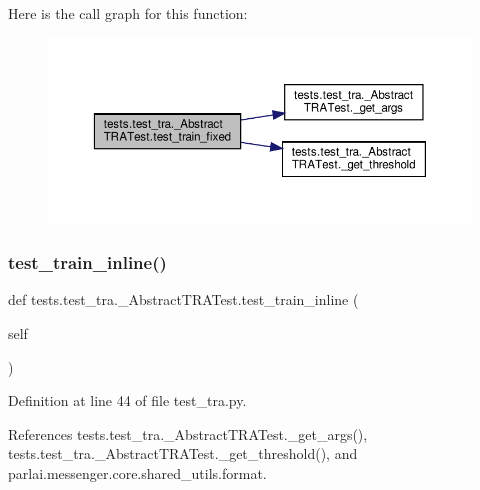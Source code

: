 Here is the call graph for this function\+:
\nopagebreak
\begin{figure}[H]
\begin{center}
\leavevmode
\includegraphics[width=350pt]{classtests_1_1test__tra_1_1__AbstractTRATest_a30a5312eaf7639e762ddbd410e31332c_cgraph}
\end{center}
\end{figure}
\mbox{\label{classtests_1_1test__tra_1_1__AbstractTRATest_a8f1fa4ff06f7fd52c1639655561fe7ee}} 
\subsubsection{\texorpdfstring{test\+\_\+train\+\_\+inline()}{test\_train\_inline()}}
{\footnotesize\ttfamily def tests.\+test\+\_\+tra.\+\_\+\+Abstract\+T\+R\+A\+Test.\+test\+\_\+train\+\_\+inline (\begin{DoxyParamCaption}\item[{}]{self }\end{DoxyParamCaption})}



Definition at line 44 of file test\+\_\+tra.\+py.



References tests.\+test\+\_\+tra.\+\_\+\+Abstract\+T\+R\+A\+Test.\+\_\+get\+\_\+args(), tests.\+test\+\_\+tra.\+\_\+\+Abstract\+T\+R\+A\+Test.\+\_\+get\+\_\+threshold(), and parlai.\+messenger.\+core.\+shared\+\_\+utils.\+format.

